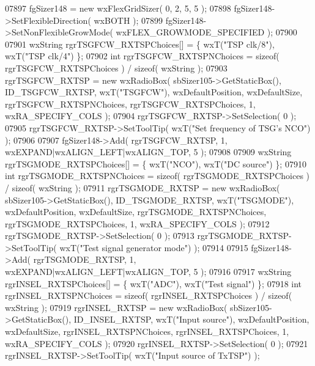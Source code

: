 \begin{DoxyCode}
07897     fgSizer148 = \textcolor{keyword}{new} wxFlexGridSizer( 0, 2, 5, 5 );
07898     fgSizer148->SetFlexibleDirection( wxBOTH );
07899     fgSizer148->SetNonFlexibleGrowMode( wxFLEX\_GROWMODE\_SPECIFIED );
07900     
07901     wxString rgrTSGFCW\_RXTSPChoices[] = \{ wxT(\textcolor{stringliteral}{"TSP clk/8"}), wxT(\textcolor{stringliteral}{"TSP clk/4"}) \};
07902     \textcolor{keywordtype}{int} rgrTSGFCW\_RXTSPNChoices = \textcolor{keyword}{sizeof}( rgrTSGFCW\_RXTSPChoices ) / \textcolor{keyword}{sizeof}( wxString );
07903     rgrTSGFCW_RXTSP = \textcolor{keyword}{new} wxRadioBox( sbSizer105->GetStaticBox(), 
      ID_TSGFCW_RXTSP, wxT(\textcolor{stringliteral}{"TSGFCW"}), wxDefaultPosition, wxDefaultSize, rgrTSGFCW\_RXTSPNChoices, 
      rgrTSGFCW\_RXTSPChoices, 1, wxRA\_SPECIFY\_COLS );
07904     rgrTSGFCW_RXTSP->SetSelection( 0 );
07905     rgrTSGFCW_RXTSP->SetToolTip( wxT(\textcolor{stringliteral}{"Set frequency of TSG's NCO"}) );
07906     
07907     fgSizer148->Add( rgrTSGFCW_RXTSP, 1, wxEXPAND|wxALIGN\_LEFT|wxALIGN\_TOP, 5 );
07908     
07909     wxString rgrTSGMODE\_RXTSPChoices[] = \{ wxT(\textcolor{stringliteral}{"NCO"}), wxT(\textcolor{stringliteral}{"DC source"}) \};
07910     \textcolor{keywordtype}{int} rgrTSGMODE\_RXTSPNChoices = \textcolor{keyword}{sizeof}( rgrTSGMODE\_RXTSPChoices ) / \textcolor{keyword}{sizeof}( wxString );
07911     rgrTSGMODE_RXTSP = \textcolor{keyword}{new} wxRadioBox( sbSizer105->GetStaticBox(), 
      ID_TSGMODE_RXTSP, wxT(\textcolor{stringliteral}{"TSGMODE"}), wxDefaultPosition, wxDefaultSize, rgrTSGMODE\_RXTSPNChoices, 
      rgrTSGMODE\_RXTSPChoices, 1, wxRA\_SPECIFY\_COLS );
07912     rgrTSGMODE_RXTSP->SetSelection( 0 );
07913     rgrTSGMODE_RXTSP->SetToolTip( wxT(\textcolor{stringliteral}{"Test signal generator mode"}) );
07914     
07915     fgSizer148->Add( rgrTSGMODE_RXTSP, 1, wxEXPAND|wxALIGN\_LEFT|wxALIGN\_TOP, 5 );
07916     
07917     wxString rgrINSEL\_RXTSPChoices[] = \{ wxT(\textcolor{stringliteral}{"ADC"}), wxT(\textcolor{stringliteral}{"Test signal"}) \};
07918     \textcolor{keywordtype}{int} rgrINSEL\_RXTSPNChoices = \textcolor{keyword}{sizeof}( rgrINSEL\_RXTSPChoices ) / \textcolor{keyword}{sizeof}( wxString );
07919     rgrINSEL_RXTSP = \textcolor{keyword}{new} wxRadioBox( sbSizer105->GetStaticBox(), ID_INSEL_RXTSP, wxT(\textcolor{stringliteral}{"Input source"}), 
      wxDefaultPosition, wxDefaultSize, rgrINSEL\_RXTSPNChoices, rgrINSEL\_RXTSPChoices, 1, wxRA\_SPECIFY\_COLS );
07920     rgrINSEL_RXTSP->SetSelection( 0 );
07921     rgrINSEL_RXTSP->SetToolTip( wxT(\textcolor{stringliteral}{"Input source of TxTSP"}) );

\end{DoxyCode}
